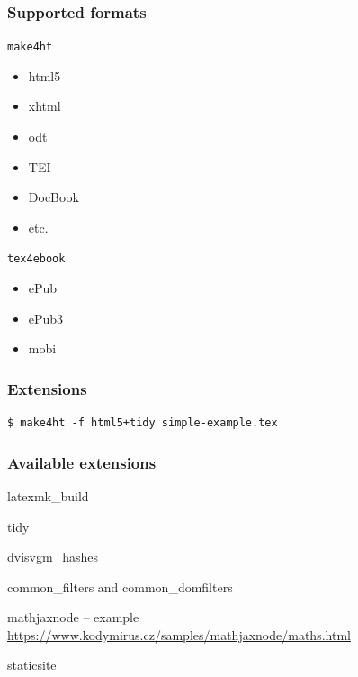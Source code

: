 \begin{frame}
  \frametitle{Supported formats}
  \texttt{make4ht}
  \begin{itemize}
    \item html5
    \item xhtml
    \item odt
    \item TEI
    \item DocBook
    \item etc.
  \end{itemize}
  \texttt{tex4ebook}
  \begin{itemize}
    \item ePub
    \item ePub3
    \item mobi
  \end{itemize}
\end{frame}

\begin{frame}[fragile]
  \frametitle{Extensions}
  \begin{priklad}
\begin{verbatim}
$ make4ht -f html5+tidy simple-example.tex
\end{verbatim}
\end{priklad}
\end{frame}

\begin{frame}
  \frametitle{Available extensions}
\begin{description}
  \item latexmk\_build
  \item tidy
  \item dvisvgm\_hashes
  \item common\_filters and common\_domfilters
  \item mathjaxnode -- example \url{https://www.kodymirus.cz/samples/mathjaxnode/maths.html}
  \item staticsite
\end{description}
\end{frame}



